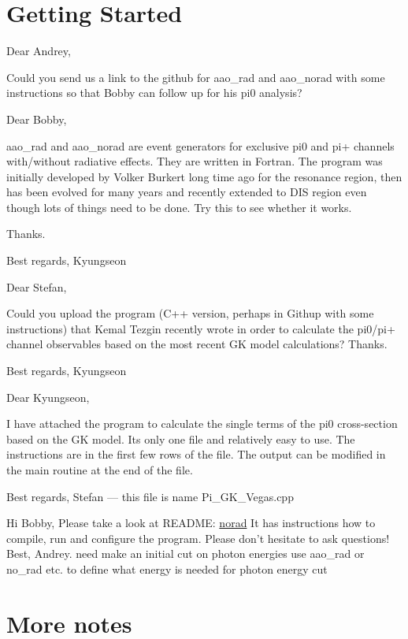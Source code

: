 \section{Getting Started}
    Dear Andrey,
    
    Could you send us a link to the github for aao\_rad and aao\_norad with some instructions so that Bobby can follow up for his pi0 analysis?  
    
    Dear Bobby,
    
    aao\_rad and aao\_norad are event generators for exclusive pi0 and pi+ channels with/without radiative effects.  They are written in Fortran.  The program was initially developed by Volker Burkert long time ago for the resonance region, then has been evolved for many years and recently extended to DIS region even though lots of things need to be done.  Try this to see whether it works.  
    
    Thanks.
    
    Best regards, Kyungseon
    
    
    Dear Stefan,
    
    Could you upload the program (C++ version, perhaps in Githup with some instructions) that Kemal Tezgin recently wrote in order to calculate the pi0/pi+ channel observables based on the most recent GK model calculations?  Thanks.
    
    Best regards, Kyungseon
    
    
    Dear Kyungseon,
    
    I have attached the program to calculate the single terms of the pi0 
    cross-section based on the GK model.
    Its only one file and relatively easy to use. The instructions are in 
    the first few rows of the file.
    The output can be modified in the main routine at the end of the file.
    
    Best regards,
    Stefan --- this file is name Pi\_GK\_Vegas.cpp
    
    
    Hi Bobby,
    Please take a look at README:
    \href{https://github.com/drewkenjo/aao\_norad}{norad}
    It has instructions how to compile, run and configure the program.
    Please don't hesitate to ask questions!
    Best,
    Andrey.
    need make an initial cut on photon energies
use aao\_rad or no\_rad etc. to define what energy is needed for photon energy cut

\section{More notes}
    

